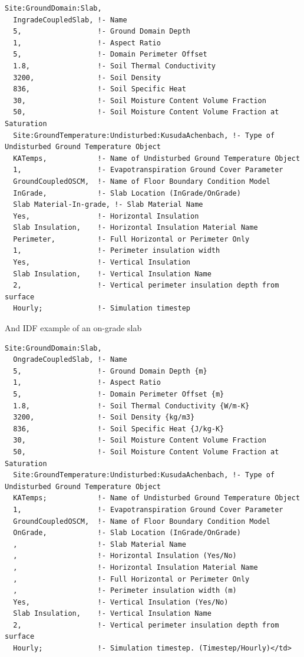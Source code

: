 \begin{lstlisting}
Site:GroundDomain:Slab,
  IngradeCoupledSlab, !- Name
  5,                  !- Ground Domain Depth
  1,                  !- Aspect Ratio
  5,                  !- Domain Perimeter Offset
  1.8,                !- Soil Thermal Conductivity
  3200,               !- Soil Density
  836,                !- Soil Specific Heat
  30,                 !- Soil Moisture Content Volume Fraction
  50,                 !- Soil Moisture Content Volume Fraction at Saturation
  Site:GroundTemperature:Undisturbed:KusudaAchenbach, !- Type of Undisturbed Ground Temperature Object
  KATemps,            !- Name of Undisturbed Ground Temperature Object
  1,                  !- Evapotranspiration Ground Cover Parameter
  GroundCoupledOSCM,  !- Name of Floor Boundary Condition Model
  InGrade,            !- Slab Location (InGrade/OnGrade)
  Slab Material-In-grade, !- Slab Material Name
  Yes,                !- Horizontal Insulation
  Slab Insulation,    !- Horizontal Insulation Material Name
  Perimeter,          !- Full Horizontal or Perimeter Only
  1,                  !- Perimeter insulation width
  Yes,                !- Vertical Insulation
  Slab Insulation,    !- Vertical Insulation Name
  2,                  !- Vertical perimeter insulation depth from surface
  Hourly;             !- Simulation timestep
\end{lstlisting}

And IDF example of an on-grade slab

\begin{lstlisting}
Site:GroundDomain:Slab,
  OngradeCoupledSlab, !- Name
  5,                  !- Ground Domain Depth {m}
  1,                  !- Aspect Ratio
  5,                  !- Domain Perimeter Offset {m}
  1.8,                !- Soil Thermal Conductivity {W/m-K}
  3200,               !- Soil Density {kg/m3}
  836,                !- Soil Specific Heat {J/kg-K}
  30,                 !- Soil Moisture Content Volume Fraction
  50,                 !- Soil Moisture Content Volume Fraction at Saturation
  Site:GroundTemperature:Undisturbed:KusudaAchenbach, !- Type of Undisturbed Ground Temperature Object
  KATemps;            !- Name of Undisturbed Ground Temperature Object
  1,                  !- Evapotranspiration Ground Cover Parameter
  GroundCoupledOSCM,  !- Name of Floor Boundary Condition Model
  OnGrade,            !- Slab Location (InGrade/OnGrade)
  ,                   !- Slab Material Name
  ,                   !- Horizontal Insulation (Yes/No)
  ,                   !- Horizontal Insulation Material Name
  ,                   !- Full Horizontal or Perimeter Only
  ,                   !- Perimeter insulation width (m)
  Yes,                !- Vertical Insulation (Yes/No)
  Slab Insulation,    !- Vertical Insulation Name
  2,                  !- Vertical perimeter insulation depth from surface
  Hourly;             !- Simulation timestep. (Timestep/Hourly)</td>
\end{lstlisting}

